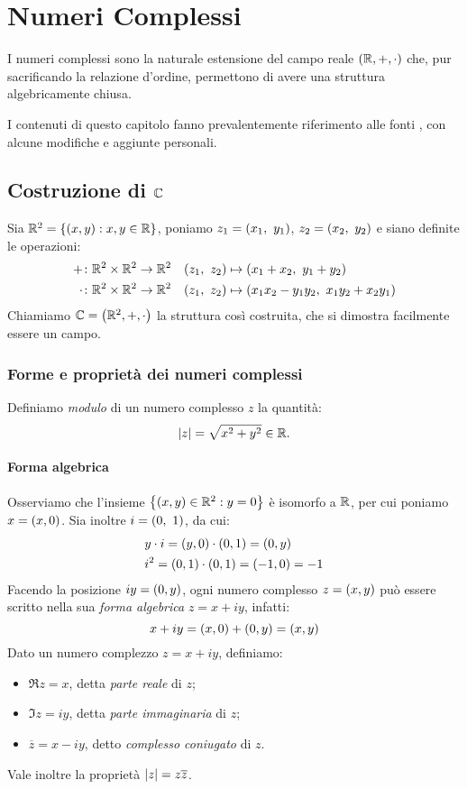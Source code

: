 \chapter{Numeri Complessi}\label{ap:A}
I numeri complessi sono la naturale estensione del campo reale $\qty(\mathbb{R},+,\cdot)$ che, pur sacrificando la relazione d'ordine, permettono di avere una struttura algebricamente chiusa. \par I contenuti di questo capitolo fanno prevalentemente riferimento alle fonti \cite{Di_Fazio2013-vk,Presilla2013-uz}, con alcune modifiche e aggiunte personali.
\section{Costruzione di $\mathbb{C}$}
Sia $\mathbb{R}^2=\qty{\qty(x,y):x,y\in\mathbb{R}}$, poniamo $z_1=\qty(x_1,\ y_1)$, $z_2=\qty(x_2,\ y_2)$ e siano definite le operazioni:
\begin{align*}
    \func{+}{\R^2\times\R^2}{\R^2}\quad&\qty(z_1,\ z_2)\mapsto\qty(x_1+x_2,\ y_1+y_2)\\
    \func{\cdot}{\R^2\times\R^2}{\R^2}\quad&\qty(z_1,\ z_2)\mapsto\qty(x_1x_2-y_1y_2,\ x_1y_2+x_2y_1)
\end{align*}
Chiamiamo $\mathbb{C}=\qty(\mathbb{R}^2,+,\cdot)$ la struttura cos\`i costruita, che si dimostra facilmente essere un campo.
\subsection{Forme e propriet\`a dei numeri complessi}
    Definiamo \emph{modulo} di un numero complesso $z$ la quantit\`a: $$\abs{z}=\sqrt{x^2+y^2}\in\mathbb{R}.$$ 
    \subsubsection{Forma algebrica}
        Osserviamo che l'insieme $\qty{\qty(x,y)\in\mathbb{R}^2:y=0}$ \`e isomorfo a $\mathbb{R}$, per cui poniamo $x=\qty(x,0)$. Sia inoltre $i=\qty(0,\ 1)$, da cui:
        \begin{align*}
            &y\cdot i=\qty(y,0)\cdot(0,1)=(0,y)\\
            &i^2=\qty(0,1)\cdot\qty(0,1)=(-1,0)=-1
        \end{align*}
        Facendo la posizione $iy=\qty(0,y)$, ogni numero complesso $z=\qty(x,y)$ pu\`o essere scritto nella sua \emph{forma algebrica} $z=x+iy$, infatti: $$x+iy=\qty(x,0)+\qty(0,y)=(x,y)$$
        Dato un numero complezzo $z=x+iy$, definiamo:
        \begin{itemize}
            \item $\Re z=x$, detta \emph{parte reale} di $z$;
            \item $\Im z=iy$, detta \emph{parte immaginaria} di $z$;
            \item $\overline{z}=x-iy$, detto \emph{complesso coniugato} di $z$.
        \end{itemize}
        Vale inoltre la propriet\`a $\abs{z}=z\overline{z}$.
